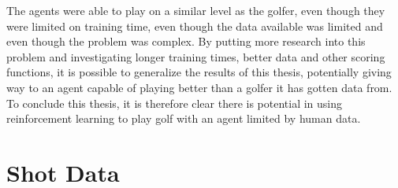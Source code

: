 \documentclass{kththesis}
\begin{document}
The agents were able to play on a similar level as the golfer, even though they were limited on training time, even though the data available was limited and even though the problem was complex. By putting more research into this problem and investigating longer training times, better data and other scoring functions, it is possible to generalize the results of this thesis, potentially giving way to an agent capable of playing better than a golfer it has gotten data from. To conclude this thesis, it is therefore clear there is potential in using reinforcement learning to play golf with an agent limited by human data.

\printbibliography[heading=bibintoc]

\appendix

\chapter{Shot Data}
\label{app:shot_data}
\end{document}

